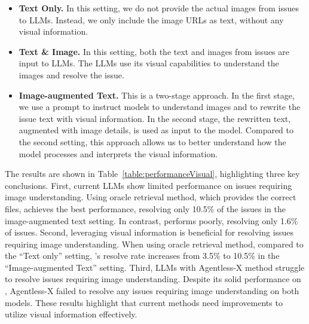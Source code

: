 \begin{itemize}[left=10pt]
     \item \textbf{Text Only.} In this setting, we do not provide the actual images from issues to LLMs. Instead, we only include the image URLs as text, without any visual information.


    \item \textbf{Text \& Image.} In this setting, both the text and images from issues are input to LLMs. The LLMs use its visual capabilities to understand the images and resolve the issue.
    

 \item \textbf{Image-augmented Text.} This is a two-stage approach. In the first stage, we use a prompt to instruct models to understand images and to rewrite the issue text with visual information. In the second stage, the rewritten text, augmented with image details, is used as input to the model. Compared to the second setting, this approach allows us to better understand how the model processes and interprets the visual information. 
    



\end{itemize}

 The results are shown in Table~\ref{table:performanceVisual}, highlighting three key conclusions. First, current LLMs show limited performance on issues requiring image understanding. Using oracle retrieval method, which provides the correct files, \Claude achieves the best performance, resolving only 10.5\% of the issues in the image-augmented text setting. In contrast, \GPT performs poorly, resolving only 1.6\% of issues. Second, leveraging visual information is beneficial for resolving issues requiring image understanding. When using oracle retrieval method, compared to the ``Text only'' setting, \Claude's resolve rate increases from 3.5\% to 10.5\% in the ``Image-augmented Text'' setting. Third, LLMs with Agentless-X method struggle to resolve issues requiring image understanding.  Despite its solid performance on \Swebenchx, Agentless-X failed to resolve any issues requiring image understanding on both models. These results highlight  that current methods need improvements to utilize visual information effectively.

 



